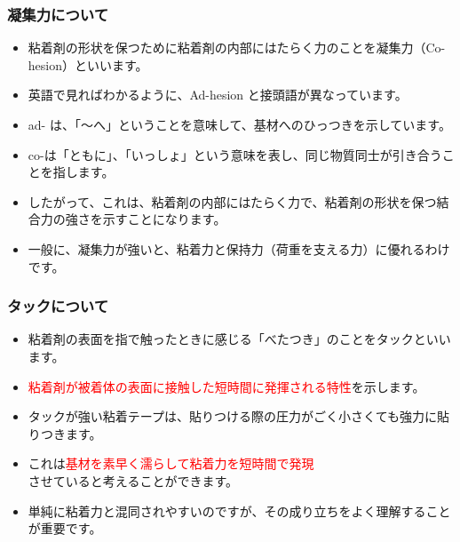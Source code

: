 \documentclass[unicode,12pt]{beamer}%
\begin{document}
\begin{frame}
	\frametitle{凝集力について}
		\begin{itemize}
			\item 粘着剤の形状を保つために粘着剤の内部にはたらく力のことを凝集力（Co-hesion）といいます。
			\item 英語で見ればわかるように、Ad-hesion と接頭語が異なっています。
			\item ad- は、「～へ」ということを意味して、基材へのひっつきを示しています。
			\item co-は「ともに」、「いっしょ」という意味を表し、同じ物質同士が引き合うことを指します。
			\item したがって、これは、粘着剤の内部にはたらく力で、粘着剤の形状を保つ結合力の強さを示すことになります。
			\item 一般に、凝集力が強いと、粘着力と保持力（荷重を支える力）に優れるわけです。
		\end{itemize}
\end{frame}

\begin{frame}
	\frametitle{タックについて}
	\begin{itemize}
		\item 粘着剤の表面を指で触ったときに感じる「べたつき」のことをタックといいます。
		\item \textcolor{red}{粘着剤が被着体の表面に接触した短時間に発揮される特性}を示します。
		\item タックが強い粘着テープは、貼りつける際の圧力がごく小さくても強力に貼りつきます。
		\item これは\textcolor{red}{基材を素早く濡らして粘着力を短時間で発現}\\させていると考えることができます。
		\item 単純に粘着力と混同されやすいのですが、その成り立ちをよく理解することが重要です。
	\end{itemize}
\end{frame}
\end{document}
